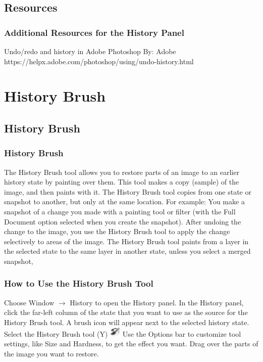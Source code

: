 \documentclass{beamer}
\begin{document}
\subsection{Resources}		
	\begin{frame}
		\frametitle{Additional Resources for the History Panel}
		\begin{outline}
			\1 Undo/redo and history in Adobe Photoshop
			\2 By:  Adobe
			\2 https://helpx.adobe.com/photoshop/using/undo-history.html
		\end{outline}
	\end{frame}


\section{History Brush}

\subsection{History Brush}		

\begin{frame}
	\frametitle{History Brush}
	\begin{outline}
		\1 The History Brush tool allows you to restore parts of an image to an earlier history state by painting over them.
		\1 This tool makes a copy (sample) of the image, and then paints with it.
		\1 The History Brush tool copies from one state or snapshot to another, but only at the same location.
		\1 For example:  
		\2 You make a snapshot of a change you made with a painting tool or filter (with the Full Document option selected when you create the snapshot). 
		\2 After undoing the change to the image, you use the History Brush tool to apply the change selectively to areas of the image. 
		\2 The History Brush tool paints from a layer in the selected state to the same layer in another state, unless you select a merged snapshot, 
	\end{outline}
\end{frame}

\begin{frame}
	\frametitle{How to Use the History Brush Tool}
	\begin{outline}
		\1 Choose Window $\rightarrow$ History to open the History panel.  
		\1 In the History panel, click the far-left column of the state that you want to use as the source for the History Brush tool. 
		\2 A brush icon will appear next to the selected history state.
		\1 Select the History Brush tool (Y) \includegraphics[width=0.04\textwidth]{images/P_HistoryBrush_Lg_N.png}
		\1 Use the Options bar to customize tool settings, like Size and Hardness, to get the effect you want.
		\1 Drag over the parts of the image you want to restore.
	\end{outline}
\end{frame}
\end{document}
